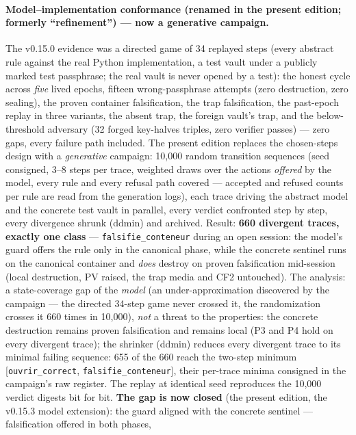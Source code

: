 \documentclass[11pt,a4paper]{article}
\newcommand{\code}[1]{\texttt{\small #1}}
\begin{document}
\paragraph{Model--implementation conformance (renamed in the present
edition; formerly ``refinement'') --- now a generative campaign.} The
v0.15.0 evidence was a directed game of 34 replayed steps (every
abstract rule against the real Python implementation, a test vault
under a publicly marked test passphrase; the real vault is never opened
by a test): the honest cycle across \emph{five} lived epochs, fifteen
wrong-passphrase attempts (zero destruction, zero sealing), the proven
container falsification, the trap falsification, the past-epoch replay
in three variants, the absent trap, the foreign vault's trap, and the
below-threshold adversary (32 forged key-halves triples, zero verifier
passes) --- zero gaps, every failure path included. The present edition
replaces the chosen-steps design with a \emph{generative} campaign:
10{,}000 random transition sequences (seed consigned, 3--8 steps per
trace, weighted draws over the actions \emph{offered} by the model,
every rule and every refusal path covered --- accepted and refused
counts per rule are read from the generation logs), each trace driving
the abstract model and the concrete test vault in parallel, every
verdict confronted step by step, every divergence shrunk (ddmin) and
archived. Result: \textbf{660 divergent traces, exactly one class} ---
\code{falsifie\_conteneur} during an open session: the model's guard
offers the rule only in the canonical phase, while the concrete
sentinel runs on the canonical container and \emph{does} destroy on
proven falsification mid-session (local destruction, PV raised, the
trap media and CF2 untouched). The analysis: a state-coverage gap of
the \emph{model} (an under-approximation discovered by the campaign
--- the directed 34-step game never crossed it, the randomization
crosses it 660 times in 10{,}000), \emph{not} a threat to the
properties: the concrete destruction remains proven falsification and
remains local (P3 and P4 hold on every divergent trace); the shrinker
(ddmin) reduces every divergent trace to its minimal failing sequence:
655 of the 660 reach the two-step minimum [\code{ouvrir\_correct},
\code{falsifie\_conteneur}], their per-trace minima consigned in the
campaign's raw register. The replay at identical seed reproduces the
10{,}000 verdict digests bit for bit. \textbf{The gap is now closed}
(the present edition, the v0.15.3 model extension): the guard aligned
with the concrete sentinel --- falsification offered in both phases,
\end{document}
